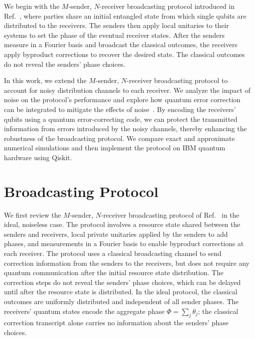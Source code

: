\documentclass[aps,physrev,10pt,twocolumn,superscriptaddress,floatfix]{revtex4-2}
\begin{document}
We begin with the $M$-sender, $N$-receiver broadcasting protocol introduced in Ref.~\cite{sukeno2023broadcasting}, where parties share an initial entangled state from which single qubits are distributed to the receivers. The senders then apply local unitaries to their systems to set the phase of the eventual receiver states. After the senders measure in a Fourier basis and broadcast the classical outcomes, the receivers apply byproduct corrections to recover the desired state. The classical outcomes do not reveal the senders' phase choices.

In this work, we extend the $M$-sender, $N$-receiver broadcasting protocol to account for noisy distribution channels to each receiver. We analyze the impact of noise on the protocol's performance and explore how quantum error correction can be integrated to mitigate the effects of noise~\cite{knill1997theory}. By encoding the receivers' qubits using a quantum error-correcting code, we can protect the transmitted information from errors introduced by the noisy channels, thereby enhancing the robustness of the broadcasting protocol. We compare exact and approximate numerical simulations and then implement the protocol on IBM quantum hardware using Qiskit.

\section{Broadcasting Protocol \label{sec:broadcasting_protocol}}
We first review the $M$-sender, $N$-receiver broadcasting protocol of Ref.~\cite{sukeno2023broadcasting} in the ideal, noiseless case. The protocol involves a resource state shared between the senders and receivers, local private unitaries applied by the senders to add phases, and measurements in a Fourier basis to enable byproduct corrections at each receiver. The protocol uses a classical broadcasting channel to send correction information from the senders to the receivers, but does not require any quantum communication after the initial resource state distribution. The correction steps do not reveal the senders' phase choices, which can be delayed until after the resource state is distributed. In the ideal protocol, the classical outcomes are uniformly distributed and independent of all sender phases. The receivers' quantum states encode the aggregate phase $\Phi=\sum_j\theta_j$; the classical correction transcript alone carries no information about the senders' phase choices.
\end{document}
